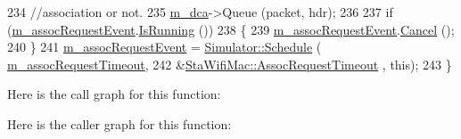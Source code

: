 \begin{DoxyCode}
234   \textcolor{comment}{//association or not.}
235   \hyperlink{classns3_1_1RegularWifiMac_a152965c3def1a308b088b37c2c88a1a2}{m\_dca}->Queue (packet, hdr);
236 
237   \textcolor{keywordflow}{if} (\hyperlink{classns3_1_1StaWifiMac_aeadb0ea670a79953896042cc2cc40c3d}{m\_assocRequestEvent}.\hyperlink{classns3_1_1EventId_aabf8476d1a080c199ea0c6aa9ccea372}{IsRunning} ())
238     \{
239       \hyperlink{classns3_1_1StaWifiMac_aeadb0ea670a79953896042cc2cc40c3d}{m\_assocRequestEvent}.\hyperlink{classns3_1_1EventId_a993ae94e48e014e1afd47edb16db7a11}{Cancel} ();
240     \}
241   \hyperlink{classns3_1_1StaWifiMac_aeadb0ea670a79953896042cc2cc40c3d}{m\_assocRequestEvent} = \hyperlink{classns3_1_1Simulator_a671882c894a08af4a5e91181bf1eec13}{Simulator::Schedule} (
      \hyperlink{classns3_1_1StaWifiMac_acac4078bfd17c0ecc1991b88fd97a242}{m\_assocRequestTimeout},
242                                              &\hyperlink{classns3_1_1StaWifiMac_a76c7409a492791cc1c3f35d779072371}{StaWifiMac::AssocRequestTimeout}
      , \textcolor{keyword}{this});
243 \}
\end{DoxyCode}


Here is the call graph for this function\+:




Here is the caller graph for this function\+:


